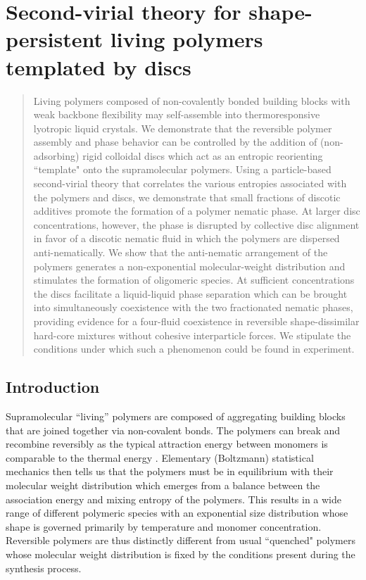 
\chapter{Second-virial theory for shape-persistent living polymers templated by discs}

\begin{abstract}

    Living polymers composed of non-covalently bonded  building blocks with weak backbone flexibility may self-assemble into thermoresponsive lyotropic liquid crystals. We demonstrate that the reversible polymer assembly and phase behavior  can be  controlled by the addition of (non-adsorbing) rigid colloidal discs which act as an entropic reorienting ``template"  onto the supramolecular polymers. Using a particle-based second-virial theory that correlates the various entropies associated with the polymers and discs, we demonstrate that small fractions of discotic additives promote the formation of a polymer nematic phase. At larger disc concentrations, however, the phase is disrupted by collective disc alignment in favor of a discotic nematic fluid in which the polymers are dispersed anti-nematically. We show that the anti-nematic arrangement of the polymers generates a non-exponential molecular-weight distribution and stimulates the formation of oligomeric species. At sufficient concentrations the discs  facilitate a liquid-liquid phase separation which can be brought into simultaneously coexistence with the two fractionated nematic phases, providing evidence for a four-fluid coexistence in reversible shape-dissimilar hard-core mixtures without cohesive interparticle forces.  We  stipulate the conditions under which such a phenomenon could be found in experiment.

\end{abstract}

\section{Introduction}


 Supramolecular ``living'' polymers are composed of  aggregating building blocks that are joined together via non-covalent bonds.  The polymers can break and recombine reversibly as the typical attraction energy between monomers is comparable to the thermal energy \cite{cates87,cates88}.  Elementary (Boltzmann) statistical mechanics then tells us that the polymers must be in equilibrium with their molecular weight distribution which emerges from a balance between the association energy and mixing entropy of the polymers. This results in a wide range of different polymeric species with an exponential size distribution whose shape is governed primarily by temperature and  monomer concentration. Reversible polymers are thus distinctly different from usual ``quenched" polymers whose molecular weight distribution is fixed  by the conditions present during the synthesis process.
 
